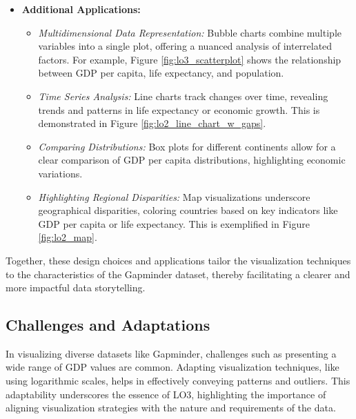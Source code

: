 \begin{itemize}
    \item \textbf{Additional Applications:}
    \begin{itemize}
        \item \textit{Multidimensional Data Representation:} Bubble charts combine multiple variables into a single plot, offering a nuanced analysis of interrelated factors. For example, Figure \ref{fig:lo3_scatterplot} shows the relationship between GDP per capita, life expectancy, and population.
        \item \textit{Time Series Analysis:} Line charts track changes over time, revealing trends and patterns in life expectancy or economic growth. This is demonstrated in Figure \ref{fig:lo2_line_chart_w_gaps}.
        \item \textit{Comparing Distributions:} Box plots for different continents allow for a clear comparison of GDP per capita distributions, highlighting economic variations.
        \item \textit{Highlighting Regional Disparities:} Map visualizations underscore geographical disparities, coloring countries based on key indicators like GDP per capita or life expectancy. This is exemplified in Figure \ref{fig:lo2_map}.
    \end{itemize}
\end{itemize}

Together, these design choices and applications tailor the visualization techniques to the characteristics of the Gapminder dataset, thereby facilitating a clearer and more impactful data storytelling.

\subsection{Challenges and Adaptations}
In visualizing diverse datasets like Gapminder, challenges such as presenting a wide range of GDP values are common. Adapting visualization techniques, like using logarithmic scales, helps in effectively conveying patterns and outliers. This adaptability underscores the essence of LO3, highlighting the importance of aligning visualization strategies with the nature and requirements of the data.